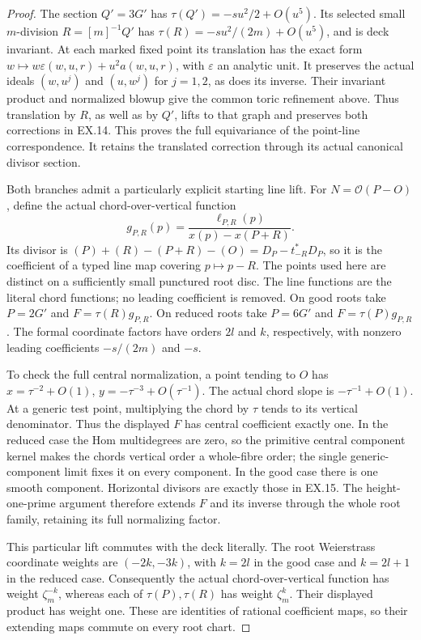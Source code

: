 \begin{proof}
The section \(Q'=3G'\) has
\(\tau(Q')=-s u^2/2+O(u^5)\). Its selected small
\(m\)-division \(R=[m]^{-1}Q'\) has
\(\tau(R)=-s u^2/(2m)+O(u^5)\), and is deck invariant.
At each marked fixed point its translation has the exact form
\(w\mapsto w\varepsilon(w,u,r)+u^2 a(w,u,r)\), with
\(\varepsilon\) an analytic unit. It preserves the actual
ideals \((w,u^j)\) and \((u,w^j)\) for \(j=1,2\), as
does its inverse. Their invariant product and normalized blowup
give the common toric refinement above. Thus translation by
\(R\), as well as by \(Q'\), lifts to that graph and preserves
both corrections in EX.14. This proves the full equivariance of
the point-line correspondence. It retains the translated
correction through its actual canonical divisor section.

Both branches admit a particularly explicit starting line lift.
For \(N=\mathcal O(P-O)\), define the actual chord-over-vertical
function
\[
 g_{P,R}(p)=\frac{\ell_{P,R}(p)}{x(p)-x(P+R)}.
 \tag{EX.15}
\]
Its divisor is \((P)+(R)-(P+R)-(O)=D_P-t_{-R}^*D_P\),
so it is the coefficient of a typed line map covering
\(p\mapsto p-R\). The points used here are distinct on a
sufficiently small punctured root disc. The line functions are
the literal chord functions; no leading coefficient is removed.
On good roots take \(P=2G'\) and
\(F=\tau(R)g_{P,R}\). On reduced roots take \(P=6G'\) and
\(F=\tau(P)g_{P,R}\). The formal coordinate factors have
orders \(2l\) and \(k\), respectively, with nonzero leading
coefficients \(-s/(2m)\) and \(-s\).

To check the full central normalization, a point tending to
\(O\) has \(x=\tau^{-2}+O(1)\),
\(y=-\tau^{-3}+O(\tau^{-1})\). The actual chord slope is
\(-\tau^{-1}+O(1)\). At a generic test point, multiplying
the chord by \(\tau\) tends to its vertical denominator.
Thus the displayed \(F\) has central coefficient exactly one.
In the reduced case the Hom multidegrees are zero, so the
primitive central component kernel makes the chord\textquotesingle s vertical
order a whole-fibre order; the single generic-component limit
fixes it on every component. In the good case there is one
smooth component. Horizontal divisors are exactly those in
EX.15. The height-one-prime argument therefore extends \(F\)
and its inverse through the whole root family, retaining its
full normalizing factor.

This particular lift commutes with the deck literally. The
root Weierstrass coordinate weights are \((-2k,-3k)\), with
\(k=2l\) in the good case and \(k=2l+1\) in the reduced case.
Consequently the actual chord-over-vertical function has weight
\(\zeta_m^{-k}\), whereas each of \(\tau(P),\tau(R)\)
has weight \(\zeta_m^k\). Their displayed product has weight
one. These are identities of rational coefficient maps, so
their extending maps commute on every root chart.


\end{proof}
